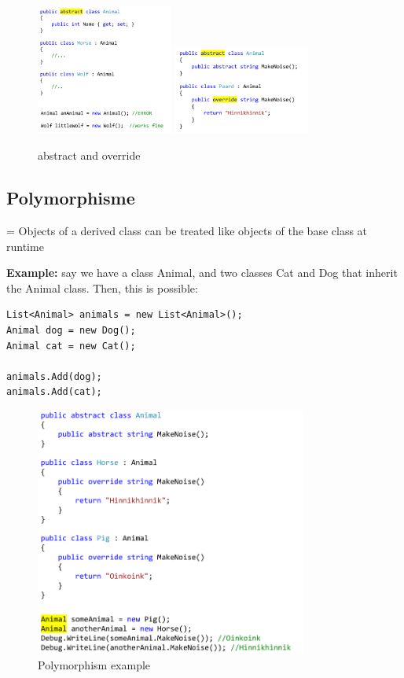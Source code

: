 \documentclass{article}
\newcommand{\bold}[1]{\textbf{#1}}
\begin{document}
\begin{figure}[H]
    \centering
    \includegraphics[width=0.4\textwidth]{inheritance-abstract.png}
    \includegraphics[width=0.4\textwidth]{inheritance-abstract2.png}
    \caption{abstract and override}
\end{figure}


\subsection{Polymorphisme}

= Objects of a derived class can be treated like objects of the base class at runtime

\bold{Example:} say we have a class Animal, and two classes Cat and Dog that inherit the Animal class.
Then, this is possible: 

\begin{verbatim}
List<Animal> animals = new List<Animal>();
Animal dog = new Dog();
Animal cat = new Cat();

animals.Add(dog);
animals.Add(cat);
\end{verbatim}

\begin{figure}[H]
    \centering
    \includegraphics[width=0.8\textwidth]{polymorphism.png}
    \caption{Polymorphism example}
\end{figure}
\end{document}
